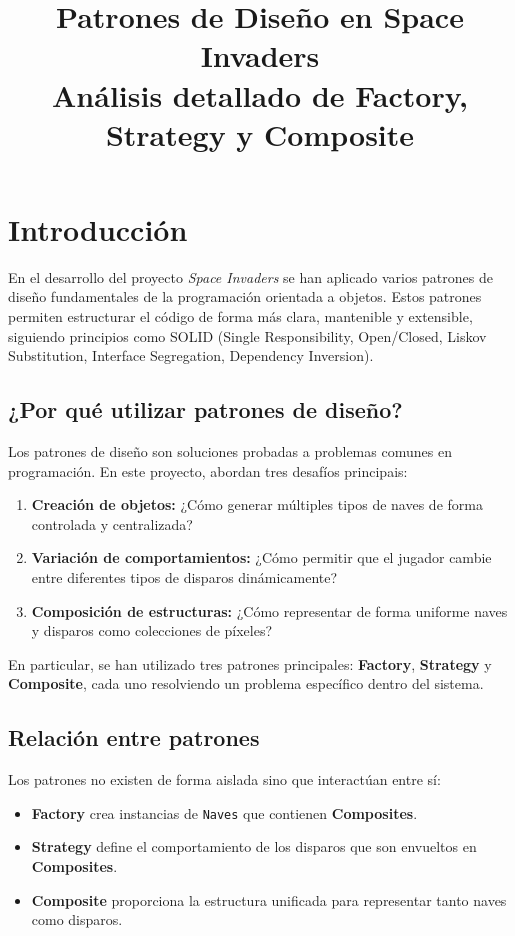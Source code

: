 \documentclass[12pt]{article}
\title{\textbf{Patrones de Diseño en Space Invaders} \\
\large{Análisis detallado de Factory, Strategy y Composite}}
\author{}
\date{}
\begin{document}
\maketitle
\onehalfspacing
\newpage
\tableofcontents
\newpage

\section{Introducción}

En el desarrollo del proyecto \textit{Space Invaders} se han aplicado varios patrones de diseño fundamentales de la programación orientada a objetos. Estos patrones permiten estructurar el código de forma más clara, mantenible y extensible, siguiendo principios como SOLID (Single Responsibility, Open/Closed, Liskov Substitution, Interface Segregation, Dependency Inversion).

\subsection{¿Por qué utilizar patrones de diseño?}

Los patrones de diseño son soluciones probadas a problemas comunes en programación. En este proyecto, abordan tres desafíos principais:

\begin{enumerate}
    \item \textbf{Creación de objetos:} ¿Cómo generar múltiples tipos de naves de forma controlada y centralizada?
    \item \textbf{Variación de comportamientos:} ¿Cómo permitir que el jugador cambie entre diferentes tipos de disparos dinámicamente?
    \item \textbf{Composición de estructuras:} ¿Cómo representar de forma uniforme naves y disparos como colecciones de píxeles?
\end{enumerate}

En particular, se han utilizado tres patrones principales: \textbf{Factory}, \textbf{Strategy} y \textbf{Composite}, cada uno resolviendo un problema específico dentro del sistema.

\subsection{Relación entre patrones}

Los patrones no existen de forma aislada sino que interactúan entre sí:

\begin{itemize}
    \item \textbf{Factory} crea instancias de \texttt{Naves} que contienen \textbf{Composites}.
    \item \textbf{Strategy} define el comportamiento de los disparos que son envueltos en \textbf{Composites}.
    \item \textbf{Composite} proporciona la estructura unificada para representar tanto naves como disparos.
\end{itemize}
\end{document}
